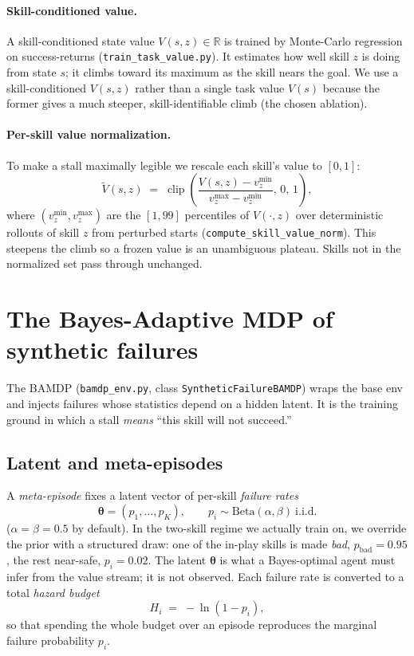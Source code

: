 \documentclass[11pt]{article}
\newcommand{\R}{\mathbb{R}}
\newcommand{\st}{s}
\newcommand{\Vnorm}{\widetilde{V}}
\newcommand{\theem}{\bm{\theta}}
\newcommand{\skill}{z}
\newcommand{\code}[1]{\texttt{\small #1}}
\begin{document}
\paragraph{Skill-conditioned value.}
A skill-conditioned state value $V(\st,\skill)\in\R$ is trained by Monte-Carlo
regression on success-returns (\code{train\_task\_value.py}). It estimates how well
skill $\skill$ is doing from state $\st$; it climbs toward its maximum as the skill
nears the goal. We use a skill-conditioned $V(\st,\skill)$ rather than a single
task value $V(\st)$ because the former gives a much steeper, skill-identifiable
climb (the chosen ablation).

\paragraph{Per-skill value normalization.}
To make a stall maximally legible we rescale each skill's value to $[0,1]$:
\begin{equation}
\Vnorm(\st,\skill) \;=\;
\operatorname{clip}\!\left(\frac{V(\st,\skill)-v^{\min}_{\skill}}
{v^{\max}_{\skill}-v^{\min}_{\skill}},\, 0,\, 1\right),
\label{eq:vnorm}
\end{equation}
where $(v^{\min}_{\skill},v^{\max}_{\skill})$ are the $[1,99]$ percentiles of
$V(\cdot,\skill)$ over deterministic rollouts of skill $\skill$ from perturbed starts
(\code{compute\_skill\_value\_norm}). This steepens the climb so a frozen value is an
unambiguous plateau. Skills not in the normalized set pass through unchanged.

\section{The Bayes-Adaptive MDP of synthetic failures}
\label{sec:bamdp}

The BAMDP (\code{bamdp\_env.py}, class \code{SyntheticFailureBAMDP}) wraps the base
env and injects failures whose statistics depend on a hidden latent. It is the
training ground in which a stall \emph{means} ``this skill will not succeed.''

\subsection{Latent and meta-episodes}
A \emph{meta-episode} fixes a latent vector of per-skill \emph{failure rates}
\begin{equation}
\theem=(p_1,\dots,p_K), \qquad p_i \sim \mathrm{Beta}(\alpha,\beta)\ \text{i.i.d.}
\end{equation}
($\alpha=\beta=0.5$ by default). In the two-skill regime we actually train on, we
override the prior with a structured draw: one of the in-play skills is made
\emph{bad}, $p_{\mathrm{bad}}=0.95$, the rest near-safe, $p_i=0.02$. The latent
$\theem$ is what a Bayes-optimal agent must infer from the value stream; it is not
observed. Each failure rate is converted to a total \emph{hazard budget}
\begin{equation}
H_i \;=\; -\ln(1-p_i),
\end{equation}
so that spending the whole budget over an episode reproduces the marginal failure
probability $p_i$.
\end{document}
